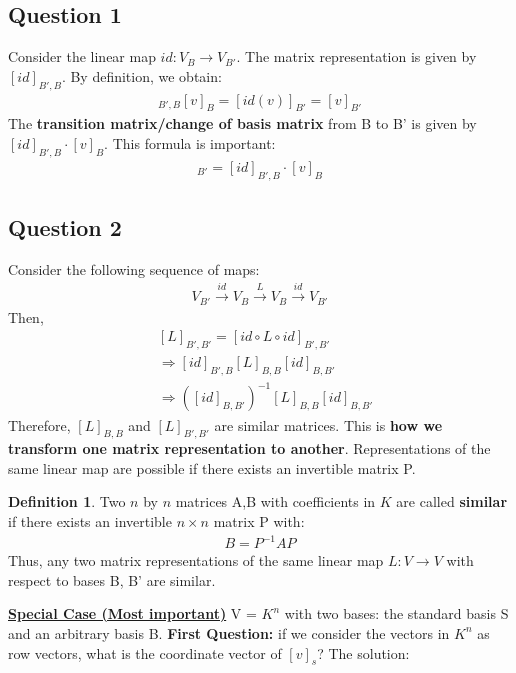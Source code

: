 \documentclass[a4paper, 12pt]{article}
\theoremstyle{definition}
\theoremstyle{definition}
\newtheorem{defn}{Definition}[section]
\theoremstyle{definition}
\theoremstyle{definition}
\begin{document}
{\subsection{Question 1}
Consider the linear map $id: V_B \rightarrow V_{B'}$. The matrix representation is given by $[id]_{B',B}$. By definition, we obtain: 
\begin{align*}
	[id]_{B',B} [v]_B = [id(v)]_{B'} = [v]_{B'} 
\end{align*}
The \textbf{transition matrix/change of basis matrix} from B to B' is given by $[id]_{B',B} \cdot [v]_{B}$. This formula is important: 
\begin{align}
	[v]_{B'} = [id]_{B',B} \cdot [v]_B
\end{align}
\subsection{Question 2}
Consider the following sequence of maps: 
\begin{align*}
	V_{B'} \xrightarrow{id} V_{B} \xrightarrow{L} V_{B} \xrightarrow{id} V_{B'}  
\end{align*}
Then, 
\begin{align*}
	& [L]_{B',B'}= [id \circ L \circ id]_{B',B'} \\
	& \Rightarrow [id]_{B',B} [L]_{B,B} [id]_{B,B'} \\
	& \Rightarrow ([id]_{B,B'})^{-1} [L]_{B,B} [id]_{B,B'} 
\end{align*}
Therefore, $[L]_{B,B}$ and $[L]_{B',B'}$ are similar matrices. 
This is \textbf{how we transform one matrix representation to another}. Representations of the same linear map are possible if there exists an invertible matrix P.
\begin{defn}
	Two $n$ by $n$ matrices A,B with coefficients in $K$ are called \textbf{similar} if there exists an invertible $n \times n$ matrix P with: 
	\begin{align*}
		B = P^{-1} A P
	\end{align*}
	Thus, any two matrix representations of the same linear map $L: V \rightarrow V$ with respect to bases B, B' are similar. 
\end{defn}
\textbf{\underline{Special Case (Most important)}}
\newline
V = $K^n$ with two bases: the standard basis S and an arbitrary basis B. \textbf{First Question:} if we consider the vectors in $K^n$ as row vectors, what is the coordinate vector of $[v]_s$?  The solution: 
\begin{align*}

\end{align*}}
\end{document}
